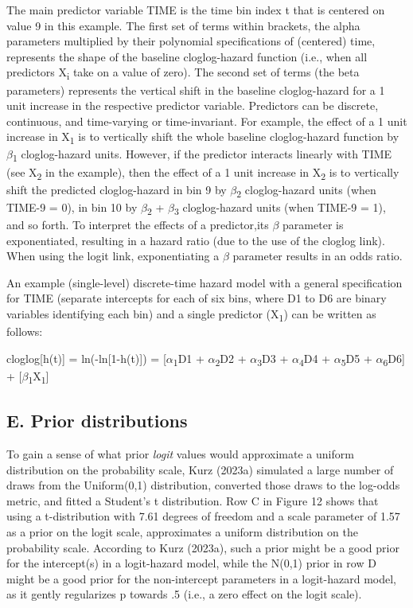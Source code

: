 \documentclass[
  man,floatsintext]{apa6}
\begin{document}
The main predictor variable TIME is the time bin index t that is centered on value 9 in this example. The first set of terms within brackets, the alpha parameters multiplied by their polynomial specifications of (centered) time, represents the shape of the baseline cloglog-hazard function (i.e., when all predictors X\textsubscript{i} take on a value of zero). The second set of terms (the beta parameters) represents the vertical shift in the baseline cloglog-hazard for a 1 unit increase in the respective predictor variable. Predictors can be discrete, continuous, and time-varying or time-invariant. For example, the effect of a 1 unit increase in X\textsubscript{1} is to vertically shift the whole baseline cloglog-hazard function by \(\beta\)\textsubscript{1} cloglog-hazard units. However, if the predictor interacts linearly with TIME (see X\textsubscript{2} in the example), then the effect of a 1 unit increase in X\textsubscript{2} is to vertically shift the predicted cloglog-hazard in bin 9 by \(\beta\)\textsubscript{2} cloglog-hazard units (when TIME-9 = 0), in bin 10 by \(\beta\)\textsubscript{2} + \(\beta\)\textsubscript{3} cloglog-hazard units (when TIME-9 = 1), and so forth. To interpret the effects of a predictor,its \(\beta\) parameter is exponentiated, resulting in a hazard ratio (due to the use of the cloglog link). When using the logit link, exponentiating a \(\beta\) parameter results in an odds ratio.

An example (single-level) discrete-time hazard model with a general specification for TIME (separate intercepts for each of six bins, where D1 to D6 are binary variables identifying each bin) and a single predictor (X\textsubscript{1}) can be written as follows:

cloglog{[}h(t){]} = ln(-ln{[}1-h(t){]}) = {[}\(\alpha\)\textsubscript{1}D1 + \(\alpha\)\textsubscript{2}D2 + \(\alpha\)\textsubscript{3}D3 + \(\alpha\)\textsubscript{4}D4 + \(\alpha\)\textsubscript{5}D5 + \(\alpha\)\textsubscript{6}D6{]} + {[}\(\beta\)\textsubscript{1}X\textsubscript{1}{]}

\subsection{E. Prior distributions}\label{e.-prior-distributions}

To gain a sense of what prior \emph{logit} values would approximate a uniform distribution on the probability scale, Kurz (2023a) simulated a large number of draws from the Uniform(0,1) distribution, converted those draws to the log-odds metric, and fitted a Student's t distribution. Row C in Figure 12 shows that using a t-distribution with 7.61 degrees of freedom and a scale parameter of 1.57 as a prior on the logit scale, approximates a uniform distribution on the probability scale. According to Kurz (2023a), such a prior might be a good prior for the intercept(s) in a logit-hazard model, while the N(0,1) prior in row D might be a good prior for the non-intercept parameters in a logit-hazard model, as it gently regularizes p towards .5 (i.e., a zero effect on the logit scale).
\end{document}
